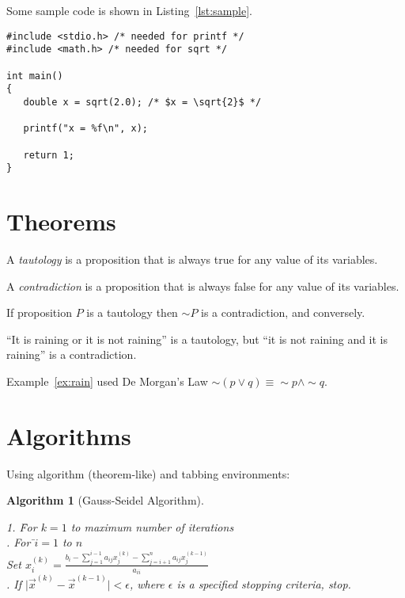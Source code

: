 \documentclass[oneside,12pt]{scrbook}
\theoremstyle{break}
\newtheorem{algorithm}[algocf]{Algorithm}
\begin{document}
Some sample code is shown in Listing~\ref{lst:sample}.

\begin{lstlisting}[mathescape=true,caption={Sample},label={lst:sample}]
#include <stdio.h> /* needed for printf */
#include <math.h> /* needed for sqrt */

int main()
{
   double x = sqrt(2.0); /* $x = \sqrt{2}$ */

   printf("x = %f\n", x);

   return 1;
}
\end{lstlisting} 

\section{Theorems}

\begin{Definition}[Tautology]
A \emph{tautology} is a proposition that is always true for any
value of its variables.
\end{Definition}

\begin{Definition}[Contradiction]
A \emph{contradiction} is a proposition that is always false for any
value of its variables.
\end{Definition}

\begin{Theorem}
If proposition $P$ is a tautology
then $\sim P$ is a contradiction,
and conversely.
\end{Theorem}

\begin{Example}\label{ex:rain}
``It is raining or it is not raining'' is a tautology,
but ``it is not raining and it is raining'' is a contradiction.
\end{Example}

\begin{Remark}
Example~\ref{ex:rain} used De Morgan’s Law
$\sim (p \vee q) \equiv \sim p \wedge \sim q$.
\end{Remark}

\section{Algorithms}

Using algorithm (theorem-like) and tabbing environments:

\begin{algorithm}[Gauss-Seidel Algorithm]
\begin{tabbing}
1. \=For $k=1$ to maximum number of iterations\\
. For \=$i=1$ to $n$\\
\>\>Set
\begin{math}
x_i^{(k)} =
\frac{b_i-\sum_{j=1}^{i-1}a_{ij}x_j^{(k)}
-\sum_{j=i+1}^{n}a_{ij}x_j^{(k-1)}}%
{a_{ii}}
\end{math}
\\
. If $\lvert\vec{x}^{(k)}-\vec{x}^{(k-1)}\rvert < \epsilon$,
where $\epsilon$ is a specified stopping criteria, stop.
\end{tabbing}
\end{algorithm}
\end{document}
